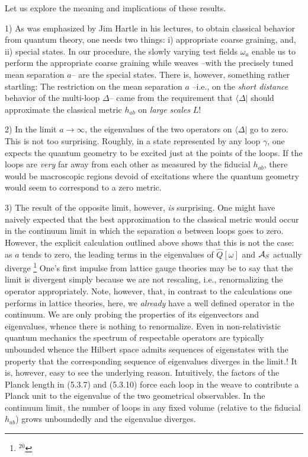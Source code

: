 Let us explore the meaning and implications of these results.
\item{1)} {As was emphasized by Jim Hartle in his lectures, to obtain
classical behavior from quantum theory, one needs two things: i) appropriate
coarse graining, and, ii) special states. In our procedure, the slowly varying
test fields $\omega_a$ enable us to perform the appropriate coarse graining
while weaves --with the precisely tuned mean separation $a$-- are the special
states. There is, however, something rather startling: The restriction on the
mean separation $a$ --i.e., on the {\it short distance} behavior of the
multi-loop $\Delta$-- came from the requirement that $\langle\Delta|$ should
approximate the classical metric $h_{ab}$ on {\it large scales} $L$!}
\item{2)} {In the limit $a\to\infty$, the eigenvalues of the two
operators on $\langle\Delta|$ go to zero. This is not too surprising. Roughly,
in a state represented by any loop $\gamma$, one expects the quantum geometry
to be excited just at the points of the loops. If the loops are {\it very}
far away from each other as measured by the fiducial $h_{ab}$, there would
be macroscopic regions devoid of excitations where the quantum geometry
would seem to correspond to a zero metric.}
\item{3)} {The result of the opposite limit,  however, {\it is} surprising.
One might have naively expected that the best approximation to the classical
metric would occur in the continuum limit in which the separation $a$ between
loops goes to zero. However, the explicit calculation outlined above shows
that this is not the case: as $a$ tends to zero, the leading terms in
the eigenvalues of $\hat{Q}[\omega]$ and ${\cal A}_S$ actually diverge
\footnote{$^{20}$} {One's first impulse from lattice gauge theories may be to
say that the limit is divergent simply because we are not rescaling, i.e.,
renormalizing the operator appropriately. Note, however, that, in contrast to
the calculations one performs in lattice theories, here, we {\it already}
have a well defined operator in the continuum. We are only probing the
properties of its eigenvectors and eigenvalues, whence there is nothing to
renormalize. Even in non-relativistic quantum mechanics the spectrum of
respectable operators are typically unbounded whence the Hilbert space
admits sequences of eigenstates with the property that the corresponding
sequence of eigenvalues diverges in the limit.}!
It is, however, easy to see the underlying reason. Intuitively, the factors
of the Planck length in (5.3.7) and (5.3.10) force each loop in the weave to
contribute a Planck unit to the eigenvalue of the two geometrical observables.
In the continuum limit, the number of loops in any fixed volume
(relative to the fiducial $h_{ab}$) grows unboundedly and the eigenvalue
diverges.}

